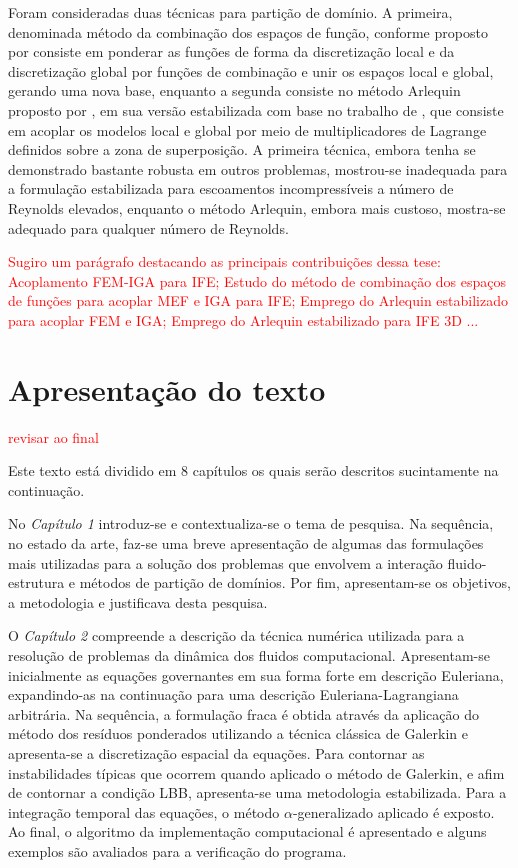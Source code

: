 \documentclass[tese_patricia.tex]{subfiles}
\begin{document}
Foram consideradas duas técnicas para partição de domínio. A primeira, denominada método da combinação dos espaços de função, conforme proposto por  consiste em ponderar as funções de forma da discretização local e da discretização global por funções de combinação e unir os espaços local e global, gerando uma nova base, enquanto a segunda consiste no método Arlequin proposto por , em sua versão estabilizada com base no trabalho de , que consiste em acoplar os modelos local e global por meio de multiplicadores de Lagrange definidos sobre a zona de superposição. A primeira técnica, embora tenha se demonstrado bastante robusta em outros problemas, mostrou-se inadequada para a formulação estabilizada para escoamentos incompressíveis a número de Reynolds elevados, enquanto o método Arlequin, embora mais custoso, mostra-se adequado para qualquer número de Reynolds.

\textcolor{red}{Sugiro um parágrafo destacando as principais contribuições dessa tese: Acoplamento FEM-IGA para IFE; Estudo do método de combinação dos espaços de funções para acoplar MEF e IGA para IFE; Emprego do Arlequin estabilizado para acoplar FEM e IGA; Emprego do Arlequin estabilizado para IFE 3D ...}


\section{Apresentação do texto}
\textcolor{red}{revisar ao final}

Este texto está dividido em 8 capítulos os quais serão descritos sucintamente na continuação.

No \textit{Capítulo 1} introduz-se e contextualiza-se o tema de pesquisa. Na sequência, no estado da arte, faz-se uma breve apresentação de algumas das formulações mais utilizadas para a solução dos problemas que envolvem a interação fluido-estrutura e métodos de partição de domínios. Por fim, apresentam-se os objetivos, a metodologia e justificava desta pesquisa.

O \textit{Capítulo 2} compreende a descrição da técnica numérica utilizada para a resolução de problemas da dinâmica dos fluidos computacional. 
Apresentam-se inicialmente as equações governantes em sua forma forte em descrição Euleriana, expandindo-as na continuação para uma descrição Euleriana-Lagrangiana arbitrária. Na sequência, a formulação fraca é obtida através da aplicação do método dos resíduos ponderados utilizando a técnica clássica de Galerkin e apresenta-se a discretização espacial da equações. Para contornar as instabilidades típicas que ocorrem quando aplicado o método de Galerkin, e afim de contornar a condição LBB, apresenta-se uma metodologia estabilizada. Para a integração temporal das equações, o método $\alpha$-generalizado aplicado é exposto. Ao final, o algoritmo da implementação computacional é apresentado e alguns exemplos são avaliados para a verificação do programa.
\end{document}
